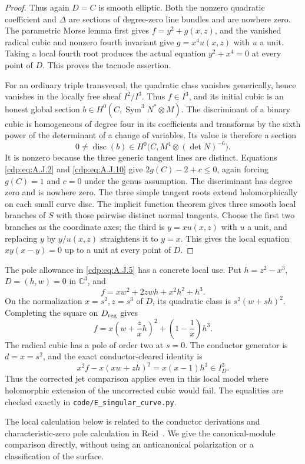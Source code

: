 \begin{proof}
Thus again $D=C$ is smooth elliptic. Both the nonzero
quadratic coefficient and $\Delta$ are sections of
degree-zero line bundles and are nowhere zero. The parametric
Morse lemma first gives $f=y^2+g(x,z)$, and the vanished
radical cubic and nonzero fourth invariant give
$g=x^4u(x,z)$ with $u$ a unit. Taking a local fourth root
produces the actual equation $y^2+x^4=0$ at every point of
$D$. This proves the tacnode assertion.

For an ordinary triple transversal, the quadratic class
vanishes generically, hence vanishes in the locally free
sheaf $I^2/I^3$. Thus $f\in I^3$, and its initial cubic
is an honest global section
$b\in H^0(C,\operatorname{Sym}^3N^*\otimes M)$.
The discriminant of a binary cubic is homogeneous of degree
four in its coefficients and transforms by the sixth power
of the determinant of a change of variables. Its value is
therefore a section
\[
 0\ne\operatorname{disc}(b)\in
 H^0\bigl(C,M^4\otimes(\det N)^{-6}\bigr).
                                                        \tag{A.J.10}\label{cdp:eq:A.J.10}
\]
It is nonzero because the three generic tangent lines are
distinct. Equations \eqref{cdp:eq:A.J.2} and \eqref{cdp:eq:A.J.10} give
$2g(C)-2+c\leq0$, again forcing $g(C)=1$ and $c=0$
under the genus assumption. The discriminant has degree
zero and is nowhere zero. The three simple tangent roots
extend holomorphically on each small curve disc. The implicit
function theorem gives three smooth local branches of $S$
with those pairwise distinct normal tangents. Choose the
first two branches as the coordinate axes; the third is
$y=xu(x,z)$ with $u$ a unit, and replacing $y$ by $y/u(x,z)$
straightens it to $y=x$. This gives the local equation
$xy(x-y)=0$ up to a unit at every point of $D$.
\end{proof}


The pole allowance in \eqref{cdp:eq:A.J.5} has a concrete local use. Put
$h=z^2-x^3$, $D=(h,w)=0$ in $\mathbb C^3$, and
\[
 f=xw^2+2zwh+x^2h^2+h^3.
\]
On the normalization $x=s^2,z=s^3$ of $D$, its quadratic
class is $s^2(w+sh)^2$. Completing the square on $D_{\rm reg}$
gives
\[
 f=x\left(w+\frac zx h\right)^2+
                  \left(1-\frac1x\right)h^3.
\]
The radical cubic has a pole of order two at $s=0$.
The conductor generator is $d=x=s^2$, and the exact
conductor-cleared identity is
\[
 x^2f-x(xw+zh)^2=x(x-1)h^3\in I_D^3.
\]
Thus the corrected jet comparison applies even in this local
model where holomorphic extension of the uncorrected cubic
would fail. The equalities are checked exactly in
\texttt{code/E\_singular\_curve.py}.

The local calculation below is related to the conductor
derivations and characteristic-zero pole calculation in
Reid~\cite[\S3.9, \S4.4--4.8]{Reid1994Nonnormal}.
We give the canonical-module comparison directly, without
using an anticanonical polarization or a classification of
the surface.


